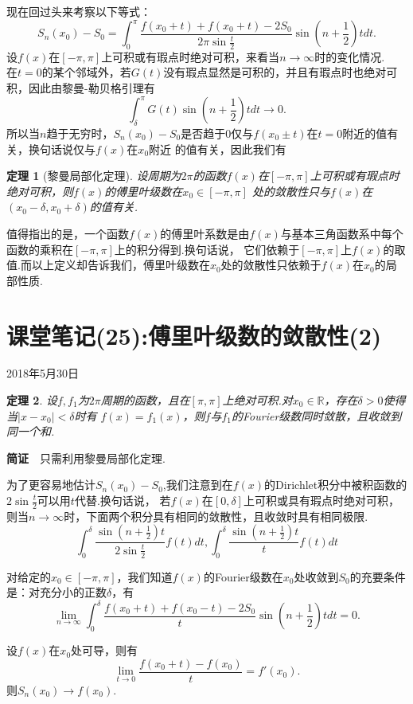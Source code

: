 \documentclass[UTF8]{article}
\newcommand{\R}{\mathbb{R}}
\newcommand{\jz}{\textbf{简证}$\quad$}
\newtheorem{thm}{\hspace{2em}定理}[section]
\begin{document}
  现在回过头来考察以下等式：
  $$S_n(x_0)-S_0=\int_0^\pi \frac{f(x_0+t)+f(x_0+t)-2S_0}{2\pi\sin\frac{t}{2}}\sin(n+\frac{1}{2})tdt.$$
  设$f(x)$在$[-\pi,\pi]$上可积或有瑕点时绝对可积，来看当$n\to\infty$时的变化情况.\\
  在$t=0$的某个邻域外，若$G(t)$没有瑕点显然是可积的，并且有瑕点时也绝对可积，因此由黎曼-勒贝格引理有
  $$\int_\delta^\pi G(t)\sin(n+\frac{1}{2})tdt\to 0.$$
  所以当$n$趋于无穷时，$S_n(x_0)-S_0$是否趋于0仅与$f(x_0\pm t)$在$t=0$附近的值有关，换句话说仅与$f(x)$在$x_0$附近
  的值有关，因此我们有
  \begin{thm}[黎曼局部化定理]
    设周期为$2\pi$的函数$f(x)$在$[-\pi,\pi]$上可积或有瑕点时绝对可积，则$f(x)$的傅里叶级数在$x_0\in[-\pi,\pi]$
    处的敛散性只与$f(x)$在$(x_0-\delta,x_0+\delta)$的值有关.
  \end{thm}
  值得指出的是，一个函数$f(x)$的傅里叶系数是由$f(x)$与基本三角函数系中每个函数的乘积在$[-\pi,\pi]$上的积分得到.换句话说，
  它们依赖于$[-\pi,\pi]$上$f(x)$的取值.而以上定义却告诉我们，傅里叶级数在$x_0$处的敛散性只依赖于$f(x)$在$x_0$的局部性质.

  \clearpage
  \section{课堂笔记(25):傅里叶级数的敛散性(2)}
  \begin{center}
    2018年5月30日
  \end{center}
  \begin{thm}
    设$f,f_1$为$2\pi$周期的函数，且在$[\pi,\pi]$上绝对可积.对$x_0\in\R$，存在$\delta>0$使得当$|x-x_0|<\delta$时有
    $f(x)=f_1(x)$，则$f$与$f_1$的Fourier级数同时敛散，且收敛到同一个和.
  \end{thm}
  \jz 只需利用黎曼局部化定理.

  为了更容易地估计$S_n(x_0)-S_0$,我们注意到在$f(x)$的Dirichlet积分中被积函数的$2\sin\frac{t}{2}$可以用$t$代替.换句话说，
  若$f(x)$在$[0,\delta]$上可积或具有瑕点时绝对可积，则当$n\to\infty$时，下面两个积分具有相同的敛散性，且收敛时具有相同极限.
  $$\int_0^\delta \frac{\sin(n+\frac{1}{2})t}{2\sin\frac{t}{2}}f(t)dt,
  \int_0^\delta \frac{\sin(n+\frac{1}{2})t}{t}f(t)dt$$

  对给定的$x_0\in[-\pi,\pi]$，我们知道$f(x)$的Fourier级数在$x_0$处收敛到$S_0$的充要条件是：对充分小的正数$\delta$，有
  $$\lim_{n\to\infty}\int_0^\delta\frac{f(x_0+t)+f(x_0-t)-2S_0}{t}\sin(n+\frac{1}{2})tdt=0.$$

  设$f(x)$在$x_0$处可导，则有
  $$\lim_{t\to0}\frac{f(x_0+t)-f(x_0)}{t}=f'(x_0).$$
  则$S_n(x_0)\to f(x_0).$
\end{document}
